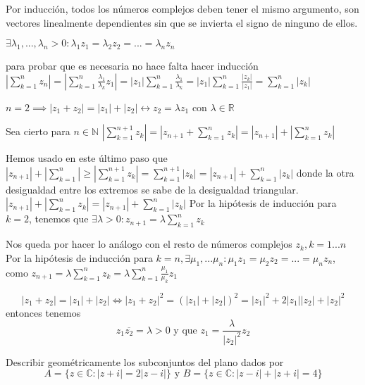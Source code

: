\begin{sol}



Por inducción, todos los números complejos deben tener el mismo argumento, son vectores linealmente dependientes sin que se invierta el signo de ninguno de ellos.

$\exists\lambda_1,...,\lambda_n>0 : \lambda_1 z_1 = \lambda_2 z_2 = ... = \lambda_n z_n$

para probar que es necesaria no hace falta hacer inducción
$ |\sum_{k=1}^n z_n| = |\sum_{k=1}^n \frac{\lambda_1}{\lambda_k} z_1| 
=
|z_1|\sum_{k=1}^n \frac{\lambda_1}{\lambda_k} 
=
|z_1|\sum_{k=1}^n \frac{|z_k|}{|z_1|} 
=
\sum_{k=1}^n |z_k|$

$n=2 \implies |z_1+z_2| = |z_1| + |z_2| \longleftrightarrow z_2 = \lambda z_1$ con $\lambda \in \mathbb{R}$

Sea cierto para $n\in\mathbb{N}$
$|\sum_{k=1}^{n+1} z_k| 
=
|z_{n+1} + \sum_{k=1}^n z_k|
=
|z_{n+1}| + |\sum_{k=1}^n z_k|$

Hemos usado en este último paso que
$|z_{n+1}|+|\sum_{k=1}^n| \geq |\sum_{k=1}^{n+1} z_k|=\sum_{k=1}^{n+1} |z_k| = |z_{n+1}| + \sum_{k=1}^n |z_k|$
donde la otra desigualdad entre los extremos se sabe de la desigualdad triangular.
$|z_{n+1}| + |\sum_{k=1}^n z_k| 
=
|z_{n+1}| + \sum_{k=1}^n |z_k|$
Por la hipótesis de inducción para $k=2$, tenemos que 
$\exists \lambda >0 : z_{n+1} = \lambda \sum_{k=1}^n z_k$

Nos queda por hacer lo análogo con el resto de números complejos $z_k,k=1...n$
Por la hipótesis de inducción para $k=n, \exists \mu_1,...\mu_n : \mu_1 z_1 = \mu_2 z_2=...= \mu_n z_n$,
como $z_{n+1} = \lambda \sum_{k=1}^n z_k 
=
\lambda \sum_{k=1}^n \frac{\mu_1}{\mu_k} z_1$

$$ |z_1+z_2| = |z_1|+|z_2| 
\Longleftrightarrow
|z_1+z_2|^2 = (|z_1|+|z_2|)^2 
=
|z_1|^2 + 2|z_1||z_2|+|z_2|^2$$
 entonces tenemos
$$z_1 \overline{z_2}=\lambda>0 \text{ y que } z_1 = \frac{\lambda}{|z_2|^2 }z_2 
$$

\end{sol}

\begin{ejer}
	Describir geométricamente los subconjuntos del plano dados por
	$$ A=\{ z\in\mathbb{C} : |z+i|=2|z-i| \} \text{ y } B=\{ z\in\mathbb{C} : |z-i| + |z+i| = 4 \} $$
\end{ejer}

